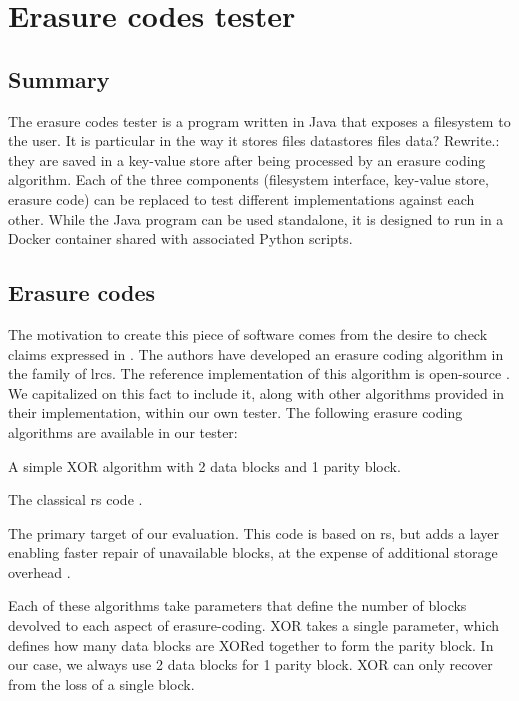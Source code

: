 \section{Erasure codes tester}

\subsection{Summary}

The erasure codes tester is a program written in Java that exposes a filesystem to the user.
It is particular in the way it stores files data{stores files data? Rewrite.}: they are saved in a key-value store after being processed by an erasure coding algorithm.
Each of the three components (filesystem interface, key-value store, erasure code) can be replaced to test different implementations against each other.
While the Java program can be used standalone, it is designed to run in a Docker container shared with associated Python scripts.

\subsection{Erasure codes}

The motivation to create this piece of software comes from the desire to check claims expressed in  \autocite{XorbasVLDB}.
The authors have developed an erasure coding algorithm in the family of \acfp{lrc}.
The reference implementation of this algorithm is open-source \autocite{xorbas-github}.
We capitalized on this fact to include it, along with other algorithms provided in their implementation, within our own tester.
The following erasure coding algorithms are available in our tester:
\begin{description}
\item[XOR] A simple XOR algorithm with 2 data blocks and 1 parity block.
\item[\acs{rs}] The classical \ac{rs} code \autocite{reed-solomon}.
\item[\acs{lrc}] The primary target of our evaluation. This code is based on \ac{rs}, but adds a layer enabling faster repair of unavailable blocks, at the expense of additional storage overhead \autocite{XorbasVLDB}.
\end{description}

Each of these algorithms take parameters that define the number of blocks devolved to each aspect of erasure-coding.
XOR takes a single parameter, which defines how many data blocks are XORed together to form the parity block.
In our case, we always use 2 data blocks for 1 parity block.
XOR can only recover from the loss of a single block.

